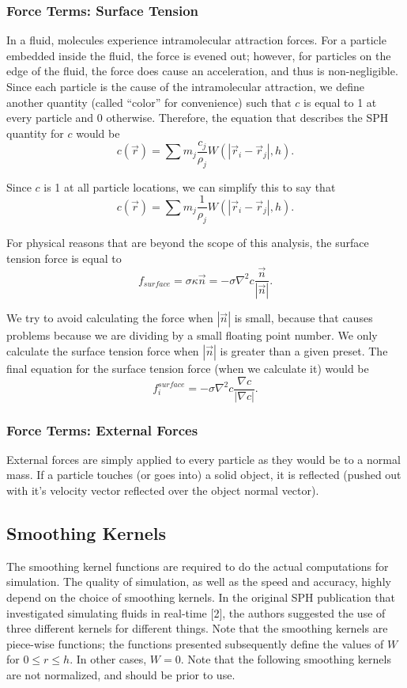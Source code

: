 \documentclass[a4paper]{article}
\begin{document}
\subsubsection{Force Terms: Surface Tension}
In a fluid, molecules experience intramolecular attraction forces. For a particle embedded inside the fluid, the force is evened out; however, for particles on the edge of the fluid, the force does cause an acceleration, and thus is non-negligible. Since each particle is the cause of the intramolecular attraction, we define another quantity (called ``color'' for convenience) such that $c$ is equal to 1 at every particle and 0 otherwise. Therefore, the equation that describes the SPH quantity for $c$ would be
\[c(\vec r) = \sum m_j \frac{c_j}{\rho_j} W(|\vec r_i - \vec r_j|, h).\]

Since $c$ is 1 at all particle locations, we can simplify this to say that
\[c(\vec r) = \sum m_j \frac{1}{\rho_j} W(|\vec r_i - \vec r_j|, h).\]

For physical reasons that are beyond the scope of this analysis, the surface tension force is equal to
\[f_{surface} = \sigma \kappa \vec n = -\sigma \nabla^2 c \frac{\vec n}{|\vec n|}.\]

We try to avoid calculating the force when $|\vec n|$ is small, because that causes problems because we are dividing by a small floating point number. We only calculate the surface tension force when $|\vec n|$ is greater than a given preset. The final equation for the surface tension force (when we calculate it) would be
\[f^{surface}_i = -\sigma \nabla^2 c \frac{\nabla c}{|\nabla c|}.\]

\subsubsection{Force Terms: External Forces}
External forces are simply applied to every particle as they would be to a normal mass. If a particle touches (or goes into) a solid object, it is reflected (pushed out with it's velocity vector reflected over the object normal vector).

\subsection{Smoothing Kernels}
The smoothing kernel functions are required to do the actual computations for simulation. The quality of simulation, as well as the speed and accuracy, highly depend on the choice of smoothing kernels. In the original SPH publication that investigated simulating fluids in real-time [2], the authors suggested the use of three different kernels for different things. Note that the smoothing kernels are piece-wise functions; the functions presented subsequently define the values of $W$ for $0 \leq r \leq h$. In other cases, $W = 0.$ Note that the following smoothing kernels are not normalized, and should be prior to use.
\end{document}
